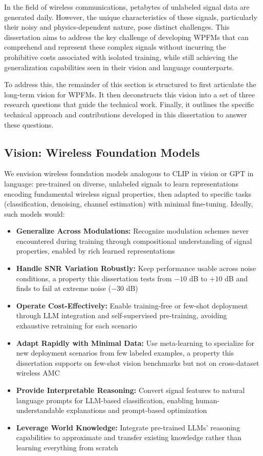 In the field of wireless communications, petabytes of unlabeled signal data are generated daily. However, the unique characteristics of these signals, particularly their noisy and physics-dependent nature, pose distinct challenges. This dissertation aims to address the key challenge of developing WPFMs that can comprehend and represent these complex signals without incurring the prohibitive costs associated with isolated training, while still achieving the generalization capabilities seen in their vision and language counterparts.

To address this, the remainder of this section is structured to first articulate the long-term vision for WPFMs. It then deconstructs this vision into a set of three research questions that guide the technical work. Finally, it outlines the specific technical approach and contributions developed in this dissertation to answer these questions.

\subsection{Vision: Wireless Foundation Models}

We envision wireless foundation models analogous to CLIP in vision or GPT in language: pre-trained on diverse, unlabeled signals to learn representations encoding fundamental wireless signal properties, then adapted to specific tasks (classification, denoising, channel estimation) with minimal fine-tuning. Ideally, such models would:

\begin{itemize}
    \item \textbf{Generalize Across Modulations:} Recognize modulation schemes never encountered during training through compositional understanding of signal properties, enabled by rich learned representations
    \item \textbf{Handle SNR Variation Robustly:} Keep performance usable across noise conditions, a property this dissertation tests from $-10$ dB to $+10$ dB and finds to fail at extreme noise ($-30$ dB)

    \item \textbf{Operate Cost-Effectively:} Enable training-free or few-shot deployment through LLM integration and self-supervised pre-training, avoiding exhaustive retraining for each scenario
    \item \textbf{Adapt Rapidly with Minimal Data:} Use meta-learning to specialize for new deployment scenarios from few labeled examples, a property this dissertation supports on few-shot vision benchmarks but not on cross-dataset wireless AMC

    \item \textbf{Provide Interpretable Reasoning:} Convert signal features to natural language prompts for LLM-based classification, enabling human-understandable explanations and prompt-based optimization
    \item \textbf{Leverage World Knowledge:} Integrate pre-trained LLMs' reasoning capabilities to approximate and transfer existing knowledge rather than learning everything from scratch
\end{itemize}

